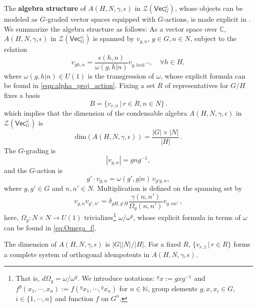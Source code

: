 \documentclass[aps,twocolumn,prx,floatfix,preprintnumbers, nofootinbib,10pt]{revtex4-2}
\numberwithin{equation}{section}
\theoremstyle{definition}
\newcommand{\be}{\begin{equation}}
\newcommand{\ee}{\end{equation}}
\newcommand{\bC}{{\mathbb C}}
\newcommand{\cZ}{\mathcal{Z}}
\renewcommand{\Vec}{\mathsf{Vec}}
\renewcommand{\dim}{\text{dim}}
\newcommand{\Vect}{\mathsf{Vec}}
\newcommand{\eps}{\epsilon}
\begin{document}
The  {\bf algebra structure} of $A(H,N,\gamma,\eps)$ in $\cZ(\Vect_G^\omega)$, whose objects can be modeled as $G$-graded vector spaces equipped with $G$-actions, is made explicit in \cite{Davydov2009ModularIF, Hannah:2023tae}. We summarize the algebra structure as follows:
As a vector space over $\bC$, $A(H,N,\gamma,\epsilon)$ in $\cZ(\Vec_G^\omega)$ is spanned by $v_{g,n}$, $g\in G, n\in N$,
subject to the relation
\be \label{eq:v_equiv_rel}
    v_{gh,n} = \frac{\epsilon(h,n)}{\omega(g,h|n)}v_{g,hnh^{-1}}, \quad \forall h\in H,
\ee
where $\omega(g,h|n)\in U(1)$ is the transgression of $\omega$, whose explicit formula can be found in \eqref{eqn:alpha_proj_action}. 
Fixing a set $R$ of representatives for $G/H$ fixes a basis 
\be
\label{eqn:basiselm}
    B=\{v_{r,n} \,|\, r\in R, n\in N\}\,.
\ee
which implies that the dimension of the condensable algebra $A(H,N,\gamma,\epsilon)$ in $\cZ(\Vec_G^\omega)$ is
\be
	\dim(A(H,N,\gamma,\eps))=\frac{|G|\times|N|}{|H|}\,.
\ee 
The $G$-grading is 
\be
    |v_{g,n}| = gng^{-1},
\ee
and the $G$-action is
\be
\label{eqn:G-action_algebra_basis}
    g'\cdot v_{g,n} = \omega( g',g|n )\, v_{g'g,n},
\ee
where $g,g'\in G$ and $n,n'\in N$. Multiplication is defined on the spanning set by
\be
\label{eqn:cond_alg_multiplication}
    v_{g,n}v_{g',n'} = \delta_{gH,g'H} \frac{\gamma(n,n')}{\Omega_g(n,n')} v_{g,nn'}\,,
\ee
here, $\Omega_g:N \times N \rightarrow U(1)$ trivializes\footnote{That is, $d\Omega_g=\omega/\omega^{g}$. We introduce notations: ${}^gx:=gxg^{-1}$ and $f^g(x_1, \cdots, x_n):=f({}^gx_1, \cdots, {}^gx_n)$ for $n\in \mathbb{N}$, group elements $g,x,x_i\in G$, $i\in \{1, \cdots, n\}$ and function $f$ on $G^n$.} $\omega/\omega^{g}$, whose explicit formula in terms of $\omega$ can be found in \eqref{eq:Omega_f}. 

The dimension of $A(H,N,\gamma,\epsilon)$ is $|G||N|/|H|$.
    For a fixed $R$, $\{v_{r,1} \,|\, r\in R\}$ forms a complete system of orthogonal idempotents in $A(H, N, \gamma, \epsilon)$. 
\end{document}
